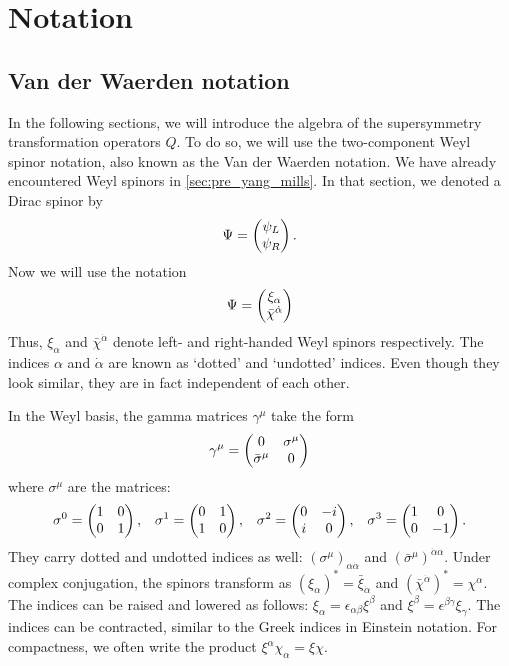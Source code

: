 \chapter{Notation}\label{ch:notation}
\section{Van der Waerden notation}
In the following sections, we will introduce the algebra of the supersymmetry transformation operators $Q$. To do so, we will use the two-component Weyl spinor notation, also known as the Van der Waerden notation. We have already encountered Weyl spinors in \autoref{sec:pre_yang_mills}. In that section, we denoted a Dirac spinor by
\begin{equation*}
\Psi = \begin{pmatrix} \psi_L \\ \psi_R\end{pmatrix}.
\end{equation*}
Now we will use the notation
\begin{equation*}
  \Psi = \begin{pmatrix} \xi_\alpha \\ \bar{\chi}^{\dot{\alpha}}\end{pmatrix}
\end{equation*}
Thus, $\xi_\alpha$ and $\bar{\chi}^{\dot{\alpha}}$ denote left- and right-handed Weyl spinors respectively. The indices $\alpha$ and $\dot{\alpha}$ are known as `dotted' and `undotted' indices. Even though they look similar, they are in fact independent of each other.

In the Weyl basis, the gamma matrices $\gamma^\mu$ take the form
\begin{equation}
  \gamma^\mu = \begin{pmatrix} 0 & \sigma^\mu \\ \bar{\sigma}^\mu & 0\end{pmatrix}
\end{equation}
where $\sigma^\mu$ are the matrices:
\begin{align*}
\sigma^0 = \begin{pmatrix} 1 & 0 \\ 0 & 1\end{pmatrix}, && \sigma^1 = \begin{pmatrix} 0 & 1 \\ 1 & 0\end{pmatrix}, && \sigma^2 = \begin{pmatrix} 0 & -i \\ i & 0\end{pmatrix}, && \sigma^3 = \begin{pmatrix} 1 & 0 \\ 0 & -1\end{pmatrix}.
\end{align*}
They carry dotted and undotted indices as well: $(\sigma^\mu)_{\alpha\dot{\alpha}}$ and $(\bar{\sigma}^\mu)^{\dot{\alpha}\alpha}$. Under complex conjugation, the spinors transform as
$(\xi_\alpha)^* = \bar{\xi}_{\dot{\alpha}}$ and $(\bar{\chi}^{\dot{\alpha}})^* = \chi^{\alpha}$. The indices can be raised and lowered as follows: $\xi_\alpha = \epsilon_{\alpha\beta}\xi^\beta$ and $\xi^\beta = \epsilon^{\beta\gamma}\xi_\gamma$.
The indices can be contracted, similar to the Greek indices in Einstein notation. For compactness, we often write the product $\xi^\alpha\chi_\alpha = \xi\chi$.
